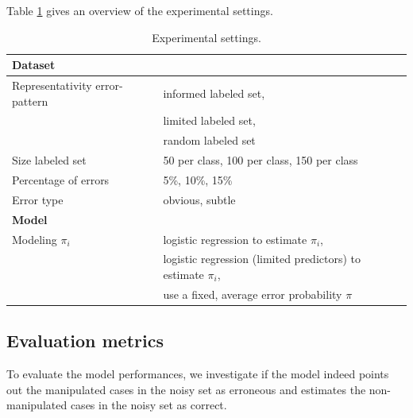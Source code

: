 \documentclass[12pt, a4paper, titlepage]{article}
\begin{document}
Table \ref{tab:table2} gives an overview of the experimental settings. 

\begin{table}[h]
\caption{\label{tab:table2}Experimental settings.}
\centering 
\begin{tabular}{ll}
\hline
\textbf{Dataset}               &                                                              \\ \hline
Representativity error-pattern & informed labeled set,                                         \\
                               & limited labeled set,                                          \\
                               & random labeled set                                           \\
Size labeled set               & 50 per class, 100 per class, 150 per class                                                \\
Percentage of errors           & 5\%, 10\%, 15\%                                              \\
Error type                     & obvious, subtle                                              \\ \hline
\textbf{Model}                 &                                                              \\ \hline
Modeling $\pi_i$               & logistic regression to estimate $\pi_i$,                      \\
                               & logistic regression (limited predictors) to estimate $\pi_i$, \\
                               & use a fixed, average error probability $\pi$                
\end{tabular}
\end{table}




					\subsection{Evaluation metrics}
					\label{section:evaluation}




To evaluate the model performances, we investigate if the model indeed points out the manipulated cases in the noisy set as erroneous and estimates the non-manipulated cases in the noisy set as correct. 
\end{document}
